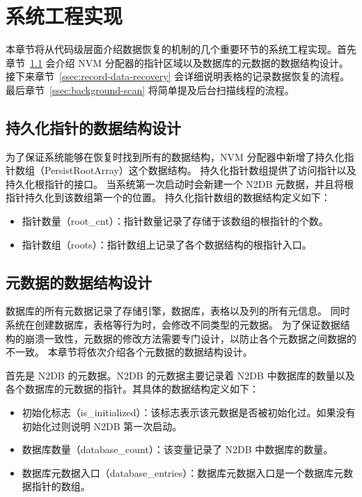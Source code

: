 \section{系统工程实现}
本章节将从代码级层面介绍数据恢复的机制的几个重要环节的系统工程实现。首先章节~\ref{ssec:data-structure-recovery} 会介绍 NVM 分配器的指针区域以及数据库的元数据的数据结构设计。
接下来章节~\ref{ssec:record-data-recovery} 会详细说明表格的记录数据恢复的流程。
最后章节~\ref{ssec:background-scan} 将简单提及后台扫描线程的流程。

\subsection{持久化指针的数据结构设计}
\label{ssec:data-structure-recovery}

为了保证系统能够在恢复时找到所有的数据结构，NVM 分配器中新增了持久化指针数组（PersistRootArray）这个数据结构。
持久化指针数组提供了访问指针以及持久化根指针的接口。
当系统第一次启动时会新建一个 N2DB 元数据，并且将根指针持久化到该数组第一个的位置。
持久化指针数组的数据结构定义如下：
\begin{itemize}
    \item 指针数量（root\_cnt）：指针数量记录了存储于该数组的根指针的个数。
    \item 指针数组（roots）：指针数组上记录了各个数据结构的根指针入口。
\end{itemize}



\subsection{元数据的数据结构设计}

数据库的所有元数据记录了存储引擎，数据库，表格以及列的所有元信息。
同时系统在创建数据库，表格等行为时，会修改不同类型的元数据。
为了保证数据结构的崩溃一致性，元数据的修改方法需要专门设计，以防止各个元数据之间数据的不一致。
本章节将依次介绍各个元数据的数据结构设计。

首先是 N2DB 的元数据。N2DB 的元数据主要记录着 N2DB 中数据库的数量以及各个数据库的元数据的指针。其具体的数据结构定义如下：
\begin{itemize}
    \item 初始化标志（is\_initialized）：该标志表示该元数据是否被初始化过。如果没有初始化过则说明 N2DB 第一次启动。
    \item 数据库数量（database\_count）：该变量记录了 N2DB 中数据库的数量。
    \item 数据库元数据入口（database\_entries）：数据库元数据入口是一个数据库元数据指针的数组。
\end{itemize}

